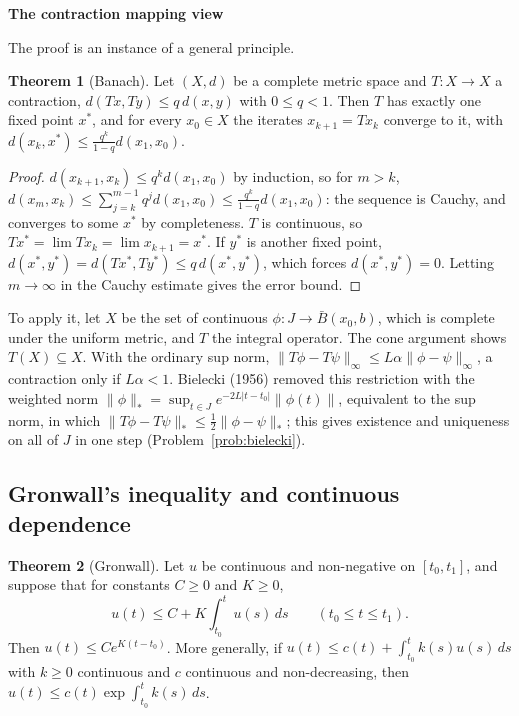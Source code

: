\documentclass[11pt,a4paper]{article}
\numberwithin{equation}{section}
\theoremstyle{definition}
\newtheorem{thm}{Theorem}[subsection]
\newcommand{\subhead}[1]{%
  \par\medskip\noindent\textbf{#1}\par\nobreak\smallskip}
\begin{document}
\subhead{The contraction mapping view}
The proof is an instance of a general principle.

\begin{thm}[Banach]
\label{thm:banach}
Let $(X, d)$ be a complete metric space and $T\colon X \to X$ a contraction, $d(Tx, Ty) \leq q\,d(x, y)$ with $0 \leq q < 1$. Then $T$ has exactly one fixed point $x^*$, and for every $x_0 \in X$ the iterates
$x_{k+1} = Tx_k$ converge to it, with $d(x_k, x^*) \leq \frac{q^k}{1 - q}d(x_1, x_0)$.
\end{thm}

\begin{proof}
$d(x_{k+1}, x_k) \leq q^kd(x_1, x_0)$ by induction, so for $m > k$, $d(x_m, x_k) \leq \sum_{j=k}^{m-1}q^jd(x_1, x_0) \leq \frac{q^k}{1 - q}d(x_1, x_0)$: the sequence is Cauchy, and converges to some $x^*$ by
completeness. $T$ is continuous, so $Tx^* = \lim Tx_k = \lim x_{k+1} = x^*$. If $y^*$ is another fixed point, $d(x^*, y^*) = d(Tx^*, Ty^*) \leq q\,d(x^*, y^*)$, which forces $d(x^*, y^*) = 0$. Letting $m \to \infty$ in the
Cauchy estimate gives the error bound.
\end{proof}

To apply it, let $X$ be the set of continuous $\phi\colon J \to \bar B(x_0, b)$, which is complete under the uniform metric, and $T$ the integral operator. The cone argument shows $T(X) \subseteq X$.
With the ordinary sup norm, $\|T\phi - T\psi\|_\infty \leq L\alpha\|\phi - \psi\|_\infty$, a contraction only if $L\alpha < 1$. Bielecki (1956) removed this restriction with the weighted norm
$\|\phi\|_\ast = \sup_{t \in J}e^{-2L|t - t_0|}\|\phi(t)\|$, equivalent to the sup norm, in which $\|T\phi - T\psi\|_\ast \leq \frac12\|\phi - \psi\|_\ast$; this gives existence and uniqueness on all of $J$ in one
step (Problem~\ref{prob:bielecki}).

\subsection{Gronwall's inequality and continuous dependence}
\label{ssec:gronwall}

\begin{thm}[Gronwall]
\label{thm:gronwall}
Let $u$ be continuous and non-negative on $[t_0, t_1]$, and suppose that for constants $C \geq 0$ and $K \geq 0$,
\[
u(t) \leq C + K\int_{t_0}^tu(s)\,ds \qquad (t_0 \leq t \leq t_1) .
\]
Then $u(t) \leq Ce^{K(t - t_0)}$. More generally, if $u(t) \leq c(t) + \int_{t_0}^tk(s)u(s)\,ds$ with $k \geq 0$ continuous and $c$ continuous and non-decreasing, then
$u(t) \leq c(t)\exp\int_{t_0}^tk(s)\,ds$.
\end{thm}
\end{document}
